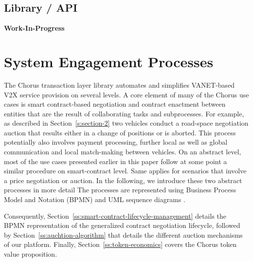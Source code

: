 \documentclass{llncs}
\begin{document}
{		%
		
		\subsection{Library / API}
			\label{ss:library-api}				

			\textbf{Work-In-Progress}
			

	
	\section{System Engagement Processes}
		\label{s:section-5}	
	
	
		The Chorus transaction layer library automates and simplifies VANET-based V2X service provision on several levels. A core element of many of the Chorus use cases is smart contract-based negotiation and contract enactment between entities that are the result of collaborating tasks and subprocesses. For example, as described in Section~\ref{s:section-2} two vehicles conduct a road-space negotiation auction that results either in a change of positions or is aborted. This process potentially also involves payment processing, further local as well as global communication and local match-making between vehicles. On an abstract level, most of the use cases presented earlier in this paper follow at some point a similar procedure on smart-contract level. Same applies for scenarios that involve a price negotiation or auction. In the following, we introduce these two abstract processes in more detail
		The processes are represented using Business Process Model and Notation (BPMN) \cite{model2011notation} and UML sequence diagrams \cite{msequenceDiagrams}.
		
		Consequently, Section~\ref{ss:smart-contract-lifecycle-management} details the BPMN representation of the generalized contract negotiation lifecycle, followed by Section~\ref{ss:auchtion-algorithm} that details the different auction mechanisms of our platform. Finally, Section~\ref{ss:token-economics} covers the Chorus token value proposition.



}
\end{document}
